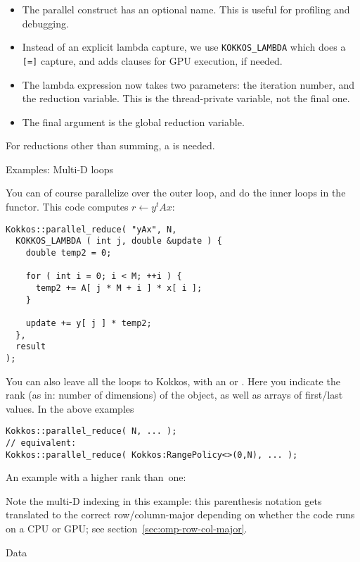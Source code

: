 \begin{itemize}
\item The parallel construct has an optional name.
  This is useful for profiling and debugging.
\item Instead of an explicit lambda capture, we use
  \lstinline+KOKKOS_LAMBDA+ which does a \lstinline+[=]+ capture,
  and adds clauses for \ac{GPU} execution, if needed.
\item The lambda expression now takes two parameters: the iteration number,
  and the reduction variable. This is the thread-private variable, not the final one.
\item The final argument is the global reduction variable.
\end{itemize}

For reductions other than summing, a  is needed.
%

 {Examples: Multi-D loops}

You can of course parallelize over the outer loop, and do the inner loops
in the functor.
This code computes $r\leftarrow y^tAx$:
%
\begin{lstlisting}
Kokkos::parallel_reduce( "yAx", N,
  KOKKOS_LAMBDA ( int j, double &update ) {
    double temp2 = 0;

    for ( int i = 0; i < M; ++i ) {
      temp2 += A[ j * M + i ] * x[ i ];
    }

    update += y[ j ] * temp2;
  },
  result
);  
\end{lstlisting}

You can also leave all the loops to Kokkos, with an
 or .
Here you indicate the rank (as in: number of dimensions) of the object,
as well as arrays of first/last values.
In the above examples
\begin{lstlisting}
Kokkos::parallel_reduce( N, ... );
// equivalent: 
Kokkos::parallel_reduce( Kokkos:RangePolicy<>(0,N), ... );  
\end{lstlisting}

An example with a higher rank than~one:
%

Note the multi-D indexing in this example: this parenthesis notation
gets translated to the correct row/column-major depending on whether the
code runs on a CPU or GPU; see section~\ref{sec:omp-row-col-major}.

 {Data}
\label{sec:kokkos-data}

